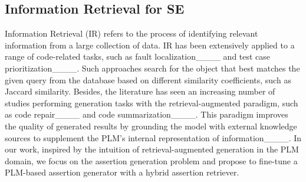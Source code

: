 \subsection{Information Retrieval for SE}
\label{sec:background_IR}

Information Retrieval (IR) refers to the process of identifying relevant information from a large collection of data.
IR has been extensively applied to a range of code-related tasks, such as fault localization____ and test case prioritization____.
Such approaches search for the object that best matches the given query from the database based on different similarity coefficients, such as Jaccard similarity.
Besides, the literature has seen an increasing number of studies performing generation tasks with the retrieval-augmented paradigm, such as code repair____ and code summarization____.
This paradigm improves the quality of generated results by grounding the model with external knowledge sources to supplement the PLM's internal representation of information____.
In our work, inspired by the intuition of retrieval-augmented generation in the PLM domain, we focus on the assertion generation problem and propose \toolname{} to fine-tune a PLM-based assertion generator with a hybrid assertion retriever.